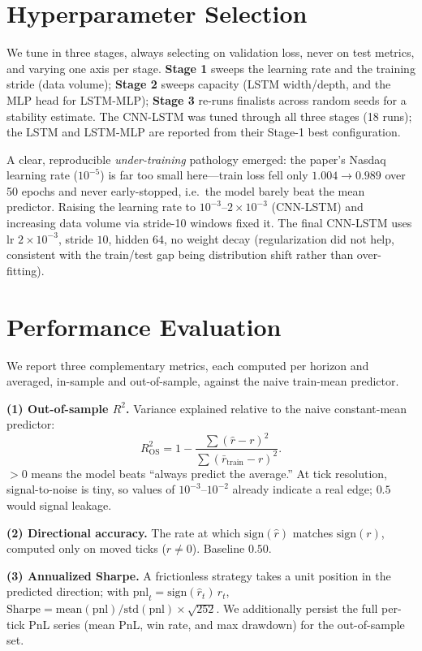 \documentclass[10pt,twocolumn]{article}
\begin{document}
\section{Hyperparameter Selection}

We tune in three stages, always selecting on validation loss, never on test
metrics, and varying one axis per stage. \textbf{Stage 1} sweeps the learning rate
and the training stride (data volume); \textbf{Stage 2} sweeps capacity (LSTM
width/depth, and the MLP head for LSTM-MLP); \textbf{Stage 3} re-runs finalists
across random seeds for a stability estimate. The CNN-LSTM was tuned through all
three stages (18 runs); the LSTM and LSTM-MLP are reported from their Stage-1 best
configuration.

A clear, reproducible \emph{under-training} pathology emerged: the paper's Nasdaq
learning rate ($10^{-5}$) is far too small here---train loss fell only
$1.004\!\to\!0.989$ over 50 epochs and never early-stopped, i.e.\ the model barely
beat the mean predictor. Raising the learning rate to $10^{-3}$--$2\!\times\!10^{-3}$
(CNN-LSTM) and increasing data volume via stride-10 windows fixed it. The final
CNN-LSTM uses lr $2\!\times\!10^{-3}$, stride $10$, hidden $64$, no weight decay
(regularization did not help, consistent with the train/test gap being
distribution shift rather than over-fitting).

\section{Performance Evaluation}
\label{sec:metrics}

We report three complementary metrics, each computed per horizon and averaged,
in-sample and out-of-sample, against the naive train-mean predictor.

\textbf{(1) Out-of-sample $R^2$.} Variance explained relative to the naive
constant-mean predictor:
\begin{equation}
R^2_{\mathrm{OS}} = 1 - \frac{\sum (\hat r - r)^2}{\sum (\bar r_{\text{train}} - r)^2}.
\end{equation}
$>0$ means the model beats ``always predict the average.'' At tick resolution,
signal-to-noise is tiny, so values of $10^{-3}$--$10^{-2}$ already indicate a real
edge; $0.5$ would signal leakage.

\textbf{(2) Directional accuracy.} The rate at which $\mathrm{sign}(\hat r)$
matches $\mathrm{sign}(r)$, computed only on moved ticks ($r\neq 0$). Baseline
$0.50$.

\textbf{(3) Annualized Sharpe.} A frictionless strategy takes a unit position in
the predicted direction; with $\mathrm{pnl}_t=\mathrm{sign}(\hat r_t)\,r_t$,
$\text{Sharpe}=\mathrm{mean}(\mathrm{pnl})/\mathrm{std}(\mathrm{pnl})\times\sqrt{252}$.
We additionally persist the full per-tick PnL series (mean PnL, win rate, and
max drawdown) for the out-of-sample set.
\end{document}
